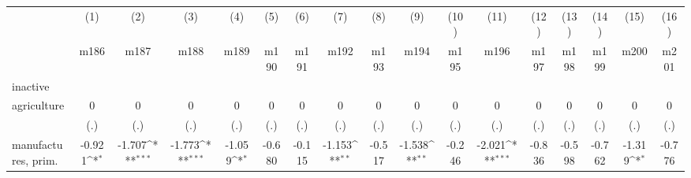 {
\def\sym#1{\ifmmode^{#1}\else\(^{#1}\)\fi}
\begin{tabular}{l*{16}{c}}
\hline\hline
                    &\multicolumn{1}{c}{(1)}&\multicolumn{1}{c}{(2)}&\multicolumn{1}{c}{(3)}&\multicolumn{1}{c}{(4)}&\multicolumn{1}{c}{(5)}&\multicolumn{1}{c}{(6)}&\multicolumn{1}{c}{(7)}&\multicolumn{1}{c}{(8)}&\multicolumn{1}{c}{(9)}&\multicolumn{1}{c}{(10)}&\multicolumn{1}{c}{(11)}&\multicolumn{1}{c}{(12)}&\multicolumn{1}{c}{(13)}&\multicolumn{1}{c}{(14)}&\multicolumn{1}{c}{(15)}&\multicolumn{1}{c}{(16)}\\
                    &\multicolumn{1}{c}{m186}&\multicolumn{1}{c}{m187}&\multicolumn{1}{c}{m188}&\multicolumn{1}{c}{m189}&\multicolumn{1}{c}{m190}&\multicolumn{1}{c}{m191}&\multicolumn{1}{c}{m192}&\multicolumn{1}{c}{m193}&\multicolumn{1}{c}{m194}&\multicolumn{1}{c}{m195}&\multicolumn{1}{c}{m196}&\multicolumn{1}{c}{m197}&\multicolumn{1}{c}{m198}&\multicolumn{1}{c}{m199}&\multicolumn{1}{c}{m200}&\multicolumn{1}{c}{m201}\\
\hline
inactive            &                     &                     &                     &                     &                     &                     &                     &                     &                     &                     &                     &                     &                     &                     &                     &                     \\
agriculture         &           0         &           0         &           0         &           0         &           0         &           0         &           0         &           0         &           0         &           0         &           0         &           0         &           0         &           0         &           0         &           0         \\
                    &         (.)         &         (.)         &         (.)         &         (.)         &         (.)         &         (.)         &         (.)         &         (.)         &         (.)         &         (.)         &         (.)         &         (.)         &         (.)         &         (.)         &         (.)         &         (.)         \\
[1em]
manufactures, prim. &      -0.921\sym{*}  &      -1.707\sym{***}&      -1.773\sym{***}&      -1.059\sym{*}  &      -0.680         &      -0.115         &      -1.153\sym{**} &      -0.517         &      -1.538\sym{**} &      -0.246         &      -2.021\sym{***}&      -0.836         &      -0.598         &      -0.762         &      -1.319\sym{*}  &      -0.776         \\

\end{tabular}}
